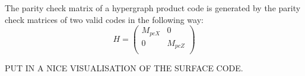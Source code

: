 The parity check matrix of a hypergraph product code is generated
by the parity check matrices of two valid codes in the following
way:
\begin{equation}
	H = \left(\begin{array}{cc}
		M_{pcX} & 0 \\
		0 & M_{pcZ} \\
	\end{array}\right)
\end{equation}

PUT IN A NICE VISUALISATION OF THE SURFACE CODE.
